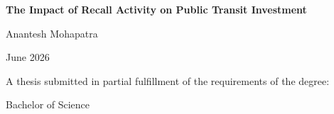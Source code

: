 \begin{titlepage}
\centering
\thispagestyle{empty}
\singlespacing
\setlength{\parskip}{0pt}
\vspace*{1.5in}
{\LARGE\bfseries The Impact of Recall Activity on Public Transit Investment\par}
\vspace{0.8in}
{\large Anantesh Mohapatra\par}
\vspace{0.5in}
{June 2026\par}
\vspace{0.8in}
{A thesis submitted in partial fulfillment of the requirements of the degree:\par}
\vspace{0.2in}
{Bachelor of Science\par}
\vspace{2pt}{Undergraduate College\par}
\vspace{2pt}{Leonard N. Stern School of Business\par}
\vspace{2pt}{New York University\par}
\vfill
\end{titlepage}
\clearpage
{}
\tableofcontents
\clearpage
{}
\setlength{\parindent}{0pt}
\setlength{\parskip}{10pt plus 2pt minus 1pt}

